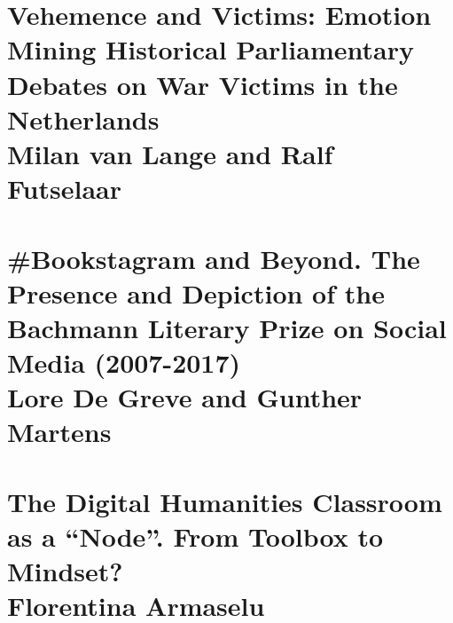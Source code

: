 \documentclass{book}
\newcommand\MyCmd[1]{\mbox{}\clearpage\setcounter{page}{#1}}
\begin{document}
\section{\textbf{Vehemence and Victims: Emotion \\ Mining Historical Parliamentary \\ Debates on War Victims in the \\ Netherlands} \\ 
Milan van Lange and Ralf Futselaar}
\MyCmd{81}
\section{\textbf{\#Bookstagram and Beyond. The \\ Presence and Depiction of the \\ Bachmann Literary Prize on Social \\ Media (2007-2017)} \\ 
Lore De Greve and Gunther Martens}
\MyCmd{103}
\section{\textbf{The Digital Humanities Classroom as a ``Node''. From Toolbox to Mindset?} \\ 
Florentina Armaselu}
\end{document}
